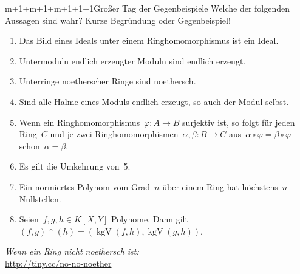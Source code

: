 \documentclass{uebblatt}
\begin{document}
\begin{aufgabe}{m+1+m+1+m+1+1+1}{Großer Tag der Gegenbeispiele}
Welche der folgenden Aussagen sind wahr? Kurze Begründung oder Gegenbeispiel!
\renewcommand{\labelenumi}{\arabic{enumi}.}
\begin{enumerate}
\item Das Bild eines Ideals unter einem Ringhomomorphismus ist ein Ideal.
\item Untermoduln endlich erzeugter Moduln sind endlich erzeugt.
\item Unterringe noetherscher Ringe sind noethersch.
\item Sind alle Halme eines Moduls endlich erzeugt, so auch der Modul selbst.
\item Wenn ein Ringhomomorphismus~$\varphi : A \to B$ surjektiv ist, so folgt
für jeden Ring~$C$ und je zwei Ringhomomorphismen~$\alpha, \beta : B \to C$ aus~$\alpha
\circ \varphi = \beta \circ \varphi$ schon~$\alpha = \beta$.
\item Es gilt die Umkehrung von~5.
\item Ein normiertes Polynom vom Grad~$n$ über einem Ring hat höchstens~$n$
Nullstellen.
\item Seien~$f,g,h \in K[X,Y]$ Polynome. Dann gilt~$(f,g) \cap (h) =
(\operatorname{kgV}(f,h), \operatorname{kgV}(g,h))$.
\end{enumerate}
\end{aufgabe}

\centering
\emph{Wenn ein Ring nicht noethersch ist:} \\
\url{http://tiny.cc/no-no-noether}
\par
\end{document}
